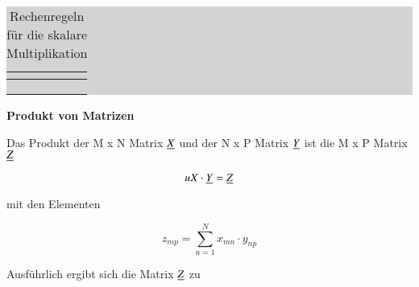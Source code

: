 \begin{table}[H]
\setlength{\arrayrulewidth}{.1em}
\caption{Rechenregeln f\"{u}r die skalare Multiplikation}
\setlength{\fboxsep}{0pt}%
\colorbox{lightgray}{%
%
\begin{tabular}{| c | c |}
\hline
\parbox[c][0.3in][c]{3.2in}{\smallskip\centering\textbf{\selectfont{Operation}}} & 
\parbox[c][0.3in][c]{3.2in}{\smallskip\centering\textbf{\selectfont{Mathematische Beschreibung}}}\\ \hline

\parbox[c][0.5in][c]{3.2in}{} &
\parbox[c][0.5in][c]{3.2in}{\centering{$(\lambda +\mu)\cdot \uX=\lambda\cdot\uX+\mu\cdot\uX $\\
$\lambda\cdot (\uX +\uY)=\lambda\cdot\uX+\lambda\cdot\uY $}}\\ \hline

\parbox[c][0.4in][c]{3.2in}{} & 
\parbox[c][0.4in][c]{3.2in}{\centering{$(\lambda \cdot\mu)\cdot \uX=\lambda \cdot(\mu\cdot \uX)$}}\\ \hline

\parbox[c][0.4in][c]{3.2in}{} & 
\parbox[c][0.4in][c]{3.2in}{}\\ \hline

\end{tabular}%
}
\label{tab:fifteenfour}
\end{table}

\selectfont
\noindent\textbf{Produkt von Matrizen}\smallskip

\noindent Das Produkt der M x N Matrix $\underline{X}$ und der N x P Matrix $\underline{Y}$ ist die M x P Matrix $\underline{Z}$

\begin{equation}\label{eq:fifteentwelve}
uX\cdot \underline{Y}=\underline{Z}
\end{equation}

\noindent mit den Elementen

\begin{equation}\label{eq:fifteenthirteen}
z_{mp}= \displaystyle\sum\limits_{n=1}^{N}x_{mn}\cdot y_{np}
\end{equation}

\noindent Ausf\"{u}hrlich ergibt sich die Matrix $\underline{Z}$ zu

